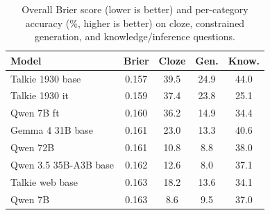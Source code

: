 \begin{table}[t]
\centering
\small
\setlength{\tabcolsep}{3pt}
\begin{tabular}{lcccc}
\toprule
\textbf{Model} & \textbf{Brier} & \textbf{Cloze} & \textbf{Gen.} & \textbf{Know.} \\
\midrule
Talkie 1930 base       & 0.157 & 39.5 & 24.9 & 44.0 \\
Talkie 1930 it         & 0.159 & 37.4 & 23.8 & 25.1 \\
Qwen 7B ft             & 0.160 & 36.2 & 14.9 & 34.4 \\
Gemma 4 31B base       & 0.161 & 23.0 & 13.3 & 40.6 \\
Qwen 72B               & 0.161 & 10.8 &  8.8 & 38.0 \\
Qwen 3.5 35B-A3B base  & 0.162 & 12.6 &  8.0 & 37.1 \\
Talkie web base        & 0.163 & 18.2 & 13.6 & 34.1 \\
Qwen 7B                & 0.163 &  8.6 &  9.5 & 37.0 \\
\bottomrule
\end{tabular}
\caption{Overall Brier score (lower is better) and per-category accuracy (\%, higher is better) on cloze, constrained generation, and knowledge/inference questions.}
\label{tab:leaderboard}
\end{table}
